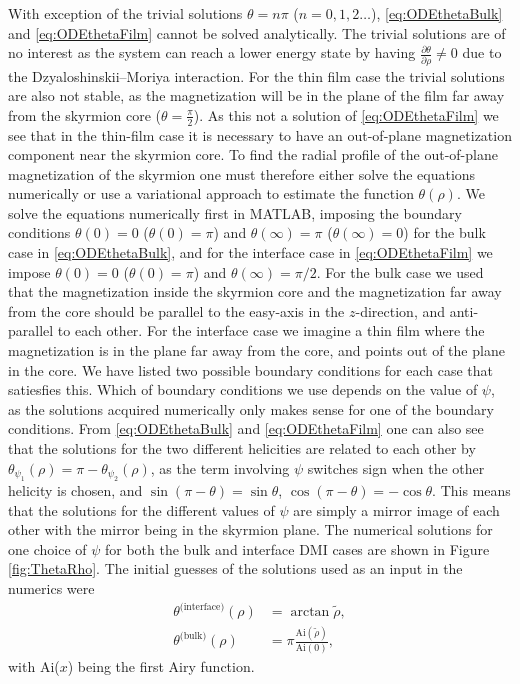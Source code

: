 \documentclass[1p]{elsarticle}		%
\numberwithin{equation}{section}
\begin{document}
With exception of the trivial solutions $\theta = n\pi$ ($n = 0, 1, 2 \ldots$), \eqref{eq:ODEthetaBulk} and \eqref{eq:ODEthetaFilm} cannot be solved analytically. The trivial solutions are of no interest as the system can reach a lower energy state by having $\frac{\partial\theta}{\partial\rho}\neq 0$ due to the Dzyaloshinskii--Moriya interaction. For the thin film case the trivial solutions are also not stable, as the magnetization will be in the plane of the film far away from the skyrmion core ($\theta=\frac{\pi}{2}$). As this not a solution of \eqref{eq:ODEthetaFilm} we see that in the thin-film case it is necessary to have an out-of-plane magnetization component near the skyrmion core. To find the radial profile of the out-of-plane magnetization of the skyrmion one must therefore either solve the equations numerically or use a variational approach to estimate the function $\theta(\rho)$. We solve the equations numerically first in MATLAB, imposing the boundary conditions $\theta(0) = 0$ ($\theta(0) = \pi$) and $\theta(\infty) = \pi$ ($\theta(\infty) = 0$) for the bulk case in \eqref{eq:ODEthetaBulk}, and for the interface case in \eqref{eq:ODEthetaFilm} we impose $\theta(0) = 0$ ($\theta(0) = \pi$) and $\theta(\infty) = \pi/2$. For the bulk case we used that the magnetization inside the skyrmion core and the magnetization far away from the core should be parallel to the easy-axis in the $z$-direction, and anti-parallel to each other. For the interface case we imagine a thin film where the magnetization is in the plane far away from the core, and points out of the plane in the core. We have listed two possible boundary conditions for each case that satiesfies this. Which of boundary conditions we use depends on the value of $\psi$, as the solutions acquired numerically only makes sense for one of the boundary conditions. From \eqref{eq:ODEthetaBulk} and \eqref{eq:ODEthetaFilm} one can also see that the solutions for the two different helicities are related to each other by $\theta_{\psi_1}(\rho) = \pi - \theta_{\psi_2}(\rho)$, as the term involving $\psi$ switches sign when the other helicity is chosen, and $\sin(\pi-\theta) = \sin\theta$, $\cos(\pi-\theta) = -\cos\theta$. This means that the solutions for the different values of $\psi$ are simply a mirror image of each other with the mirror being in the skyrmion plane. The numerical solutions for one choice of $\psi$ for both the bulk and interface DMI cases are shown in Figure \ref{fig:ThetaRho}. The initial guesses of the solutions used as an input in the numerics were
\begin{align}
\theta^{\text{(interface)}}(\rho) &= \arctan\tilde{\rho}, \\
\theta^{\text{(bulk)}}(\rho) &= \pi \frac{\text{Ai}(\tilde{\rho})}{\text{Ai}(0)},
\end{align}
with Ai($x$) being the first Airy function.
\end{document}
